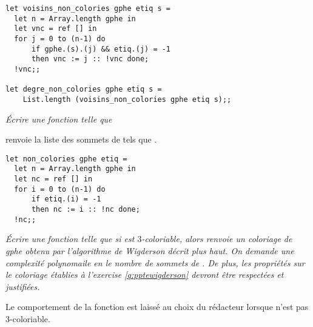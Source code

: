 \begin{Answer}
\begin{lstlisting}
let voisins_non_colories gphe etiq s =
  let n = Array.length gphe in
  let vnc = ref [] in
  for j = 0 to (n-1) do
      if gphe.(s).(j) && etiq.(j) = -1
      then vnc := j :: !vnc done;
  !vnc;;
  
let degre_non_colories gphe etiq s =
    List.length (voisins_non_colories gphe etiq s);;
\end{lstlisting}
\end{Answer}
\begin{Exercise}\it 
Écrire une fonction  telle que

 renvoie la liste des sommets  de  tels que . 
\end{Exercise} 
\begin{Answer}
\begin{lstlisting}
let non_colories gphe etiq =
  let n = Array.length gphe in
  let nc = ref [] in
  for i = 0 to (n-1) do
      if etiq.(i) = -1
      then nc := i :: !nc done;
  !nc;;
\end{lstlisting}
\newpage
\end{Answer}
\begin{Exercise}\it 
Écrire une fonction  telle que si  est $3$-coloriable, alors  renvoie un coloriage de gphe obtenu par l'algorithme de Wigderson décrit plus haut. On demande une complexité polynomaile en le nombre de sommets de . De plus, les propriétés sur le coloriage établies à l'exercise \ref{q:pptewigderson} devront être respectées et justifiées. 

Le comportement de la fonction est laissé au choix du rédacteur lorsque  n'est pas $3$-coloriable.
\end{Exercise} 
